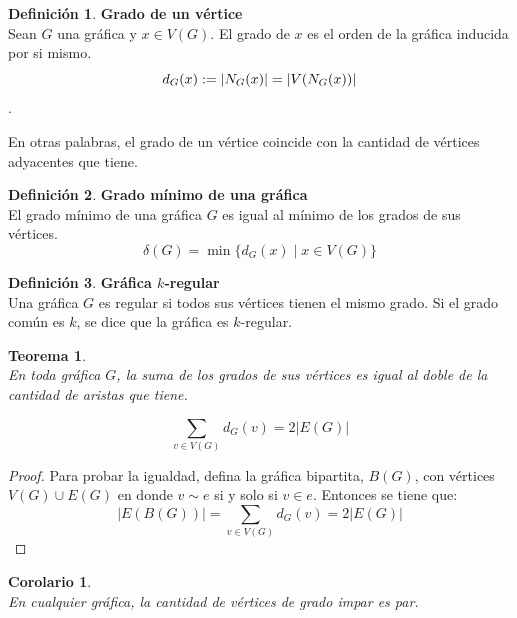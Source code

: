 \documentclass[12pt]{book}
\newtheorem{theorem}{Teorema}
\newtheorem{corollary}{Corolario}
\theoremstyle{definition}
\newtheorem{definition}{Definición}
\begin{document}
\begin{definition}\textbf{Grado de un vértice}\\
  Sean $G$ una gráfica y $x\in V(G)$. El grado de $x$ es el orden de la gráfica inducida por si mismo.
 $$d_G(x)\index{$d_G(x)$}:=|N_G(x)|=|V(N_G(x))|$$.
\end{definition}
En otras palabras, el grado de un vértice coincide con la cantidad de vértices adyacentes que tiene.

\begin{definition}\textbf{Grado mínimo de una gráfica}\\
  El grado mínimo de una gráfica $G$  es igual al mínimo de los grados de sus vértices.
$$\delta(G)=\min
  \{d_G(x)\mid x\in V(G)\}$$
\end{definition}



\begin{definition}\textbf{Gráfica $k$-regular}\\
  Una gráfica $G$ es regular si todos sus vértices tienen el mismo
  grado. Si el grado común es $k$, se dice que la gráfica es
  $k$-regular.
\end{definition}


\begin{theorem}\textbf{}\\
  \label{teogradoaristas} En toda gráfica $G$, la suma de los grados de sus vértices es igual al doble de la cantidad de aristas que tiene.

\begin{equation*}
  \sum_{v\in
    V(G)}d_G(v)=2|E(G)|
\end{equation*}
\end{theorem}

\begin{proof} Para probar la igualdad, defina la gráfica bipartita, $B(G)$, con vértices
$V(G)\cup E(G)$ en donde $v\sim e$ si y solo si $v\in e$. Entonces se
tiene que:
\begin{equation*}
  |E(B(G))| = \sum_{v\in V(G)}d_G(v)=2|E(G)|
\end{equation*}
\end{proof}

\begin{corollary}\textbf{}\\
  \label{gradoparesimpar} En cualquier gráfica, la cantidad de
  vértices de grado impar es par.
\end{corollary}
\end{document}
